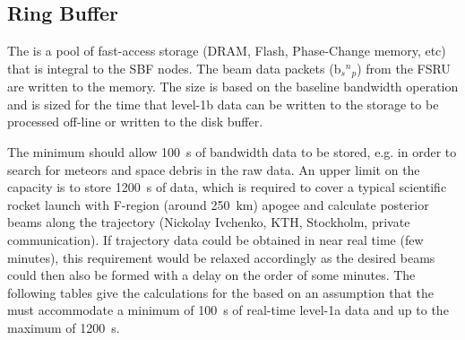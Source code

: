 \documentclass[12pt,a4paper]{article}
\begin{document}


\subsection{Ring Buffer}
\label{ssec:ring-buffer}

The \RB is a pool of fast-access storage (DRAM, Flash, Phase-Change memory, etc) that is integral to the SBF nodes. 
The beam data packets (b${_s} {^n} {_p}$) from the FSRU are written to the \RB memory.
The \RB size is based on the baseline \NBW{} bandwidth operation and is sized for 
the time that level-1b data can be written to the storage to be processed off-line or written to the disk buffer. 

The minimum \RB should allow 100~s of \NBW{} bandwidth data to be stored, e.g. in order to search for meteors and space debris in the raw data.
An upper limit on the \RB capacity is to store 1200~s of \WBW{} data, which is required to cover a typical scientific rocket launch with F-region (around 250~km) apogee and calculate posterior beams along the trajectory (Nickolay Ivchenko, KTH, Stockholm, private communication). 
If trajectory data could be obtained in near real time (few minutes), this requirement would be relaxed accordingly as the desired beams could then also be formed with a delay on the order of some minutes. 
The following tables give the calculations for the \RB based on an assumption that the \RB must accommodate a minimum of 100~s of real-time \NBW{} level-1a data and up to the maximum of 1200~s.
\end{document}

